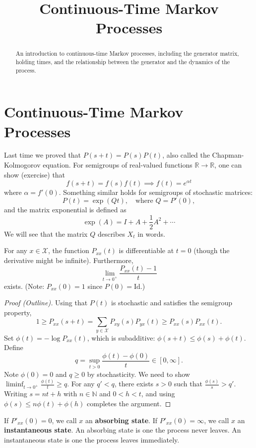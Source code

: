 \documentclass{ximera}
\title{Continuous-Time Markov Processes}
\begin{document}
\begin{abstract}
An introduction to continuous-time Markov processes, including the generator matrix, holding times, and the relationship between the generator and the dynamics of the process.
\end{abstract}
\maketitle

\section*{Continuous-Time Markov Processes}

Last time we proved that $P(s+t) = P(s)P(t)$, also called the Chapman-Kolmogorov equation. For semigroups of real-valued functions $\mathbb{R} \to \mathbb{R}$, one can show (exercise) that
\[
f(s+t) = f(s)f(t) \implies f(t) = e^{\alpha t}
\]
where $\alpha = f'(0)$. Something similar holds for semigroups of stochastic matrices:
\[
P(t) = \exp(Qt), \quad \text{where } Q = P'(0),
\]
and the matrix exponential is defined as
\[
\exp(A) = I + A + \frac{1}{2}A^2 + \cdots
\]
We will see that the matrix $Q$ describes $X_t$ in words.

\begin{theorem}
For any $x \in \mathcal{X}$, the function $P_{xx}(t)$ is differentiable at $t = 0$ (though the derivative might be infinite). Furthermore,
\[
\lim_{t \to 0^+} \frac{P_{xx}(t) - 1}{t}
\]
exists. (Note: $P_{xx}(0) = 1$ since $P(0) = \text{Id}$.)
\end{theorem}

\begin{proof}[Proof (Outline)]
Using that $P(t)$ is stochastic and satisfies the semigroup property,
\[
1 \geq P_{xx}(s+t) = \sum_{y \in \mathcal{X}} P_{xy}(s) P_{yx}(t) \geq P_{xx}(s) P_{xx}(t).
\]
Set $\phi(t) = -\log P_{xx}(t)$, which is subadditive: $\phi(s+t) \leq \phi(s) + \phi(t)$. Define
\[
q = \sup_{t > 0} \frac{\phi(t) - \phi(0)}{t} \in [0, \infty].
\]
Note $\phi(0) = 0$ and $q \geq 0$ by stochasticity. We need to show $\liminf_{t \to 0^+} \frac{\phi(t)}{t} \geq q$. For any $q' < q$, there exists $s > 0$ such that $\frac{\phi(s)}{s} > q'$. Writing $s = nt + h$ with $n \in \mathbb{N}$ and $0 < h < t$, and using $\phi(s) \leq n\phi(t) + \phi(h)$ completes the argument.
\end{proof}

\begin{definition}
If $P'_{xx}(0) = 0$, we call $x$ an \textbf{absorbing state}. If $P'_{xx}(0) = \infty$, we call $x$ an \textbf{instantaneous state}. An absorbing state is one the process never leaves. An instantaneous state is one the process leaves immediately.
\end{definition}
\end{document}
